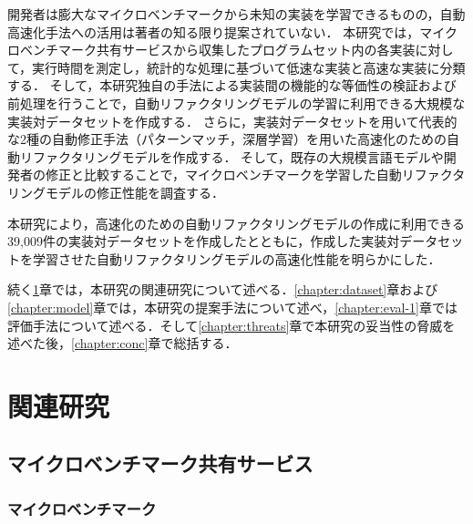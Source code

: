 \documentclass[11pt]{jreport}
\begin{document}
開発者は膨大なマイクロベンチマークから未知の実装を学習できるものの，自動高速化手法への活用は著者の知る限り提案されていない．
本研究では，マイクロベンチマーク共有サービスから収集したプログラムセット内の各実装に対して，実行時間を測定し，統計的な処理に基づいて低速な実装と高速な実装に分類する．
そして，本研究独自の手法による実装間の機能的な等価性の検証および前処理を行うことで，自動リファクタリングモデルの学習に利用できる大規模な実装対データセットを作成する．
さらに，実装対データセットを用いて代表的な2種の自動修正手法（パターンマッチ，深層学習）を用いた高速化のための自動リファクタリングモデルを作成する．
そして，既存の大規模言語モデルや開発者の修正と比較することで，マイクロベンチマークを学習した自動リファクタリングモデルの修正性能を調査する．

本研究により，高速化のための自動リファクタリングモデルの作成に利用できる39,009件の実装対データセットを作成したとともに，作成した実装対データセットを学習させた自動リファクタリングモデルの高速化性能を明らかにした．

続く\ref{chapter:related-work}章では，本研究の関連研究について述べる．\ref{chapter:dataset}章および\ref{chapter:model}章では，本研究の提案手法について述べ，\ref{chapter:eval-1}章では評価手法について述べる．そして\ref{chapter:threats}章で本研究の妥当性の脅威を述べた後，\ref{chapter:conc}章で総括する．




\chapter{関連研究}\label{chapter:related-work}




\section{マイクロベンチマーク共有サービス}




\subsection{マイクロベンチマーク}
\end{document}
